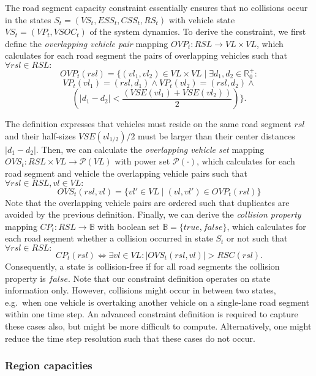 The road segment capacity constraint essentially ensures that no collisions occur in the states $S_t = (VS_t, ESS_t, CSS_t, RS_t)$ with vehicle state $VS_t = (VP_t, VSOC_t)$ of the system dynamics. To derive the constraint, we first define the \textit{overlapping vehicle pair} mapping $OVP_t : RSL \rightarrow VL \times VL$, which calculates for each road segment the pairs of overlapping vehicles such that $\forall rsl \in RSL:$
\[
	OVP_t(rsl) = \{(vl_1, vl_2) \in VL \times VL \mid \exists d_1, d_2 \in \mathbb{R}_0^+:
\]
\[
	VP_t(vl_1) = (rsl, d_1) \wedge VP_t(vl_2) = (rsl, d_2) \wedge
\]
\[
(|d_1 - d_2| < \frac{(VSE(vl_1)+VSE(vl_2))}{2} ) \} \textrm{.}	
\]


The definition expresses that vehicles must reside on the same road segment $rsl$ and their half-sizes $VSE(vl_{1/2}) / 2$ must be larger than their center distances $|d_1 - d_2|$. Then, we can calculate the \textit{overlapping vehicle set} mapping $OVS_t : RSL \times VL \rightarrow \mathcal{P}(VL)$ with power set $\mathcal{P}(\cdot)$, which calculates for each road segment and vehicle the overlapping vehicle pairs such that $\forall rsl \in RSL, vl \in VL:$
\[
	OVS_t(rsl,vl) = \{vl' \in VL \mid (vl, vl') \in OVP_t(rsl)\}
\]
Note that the overlapping vehicle pairs are ordered such that duplicates are avoided by the previous definition. Finally, we can derive the \textit{collision property} mapping $CP_t : RSL \rightarrow \mathbb{B}$ with boolean set $\mathbb{B} = \{true, false\}$, which calculates for each road segment whether a collision occurred in state $S_t$ or not such that $\forall rsl \in RSL:$
\[
	CP_t(rsl) \Leftrightarrow \exists vl \in VL : |OVS_t(rsl, vl)| > RSC(rsl) \textrm{.}
\]
Consequently, a state is collision-free if for all road segments the collision property is $false$. Note that our constraint definition operates on state information only. However, collisions might occur in between two states, e.g.\ when one vehicle is overtaking another vehicle on a single-lane road segment within one time step. An advanced constraint definition is required to capture these cases also, but might be more difficult to compute. Alternatively, one might reduce the time step resolution such that these cases do not occur.

\subsubsection{Region capacities}
\label{capacities}

